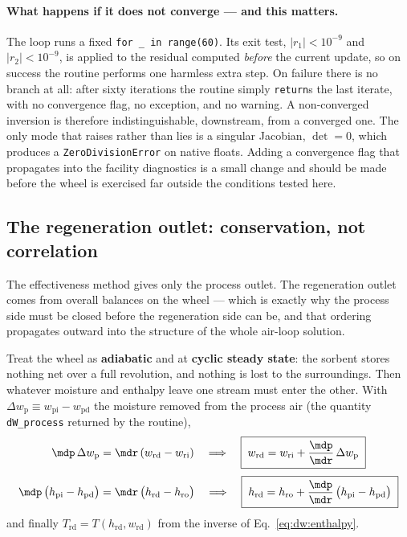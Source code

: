 \paragraph{What happens if it does not converge --- and this matters.}
The loop runs a fixed \texttt{for \_ in range(60)}. Its exit test,
$|r_1|<10^{-9}$ and $|r_2|<10^{-9}$, is applied to the residual computed
\emph{before} the current update, so on success the routine performs one
harmless extra step. On failure there is no branch at all: after sixty
iterations the routine simply \texttt{return}s the last iterate, with no
convergence flag, no exception, and no warning. A non-converged inversion is
therefore indistinguishable, downstream, from a converged one. The only mode
that raises rather than lies is a singular Jacobian, $\det=0$, which produces
a \texttt{ZeroDivisionError} on native floats. Adding a convergence flag that
propagates into the facility diagnostics is a small change and should be made
before the wheel is exercised far outside the conditions tested here.

\subsection{The regeneration outlet: conservation, not correlation}
\label{sec:dw:regen}

The effectiveness method gives only the process outlet. The regeneration
outlet comes from overall balances on the wheel --- which is exactly why the
process side must be closed before the regeneration side can be, and that
ordering propagates outward into the structure of the whole air-loop
solution.

Treat the wheel as \textbf{adiabatic} and at \textbf{cyclic steady state}: the
sorbent stores nothing net over a full revolution, and nothing is lost to the
surroundings. Then whatever moisture and enthalpy leave one stream must enter
the other. With
$\Delta w_{\mathrm{p}} \equiv w_{\mathrm{pi}} - w_{\mathrm{pd}}$ the moisture
removed from the process air (the quantity \texttt{dW\_process} returned by
the routine),
\begin{equation}
\mdp\,\Delta w_{\mathrm{p}} = \mdr\,(w_{\mathrm{rd}}-w_{\mathrm{ri}})
\quad\Longrightarrow\quad
\boxed{\;w_{\mathrm{rd}} = w_{\mathrm{ri}}
+ \frac{\mdp}{\mdr}\,\Delta w_{\mathrm{p}}\;}
\label{eq:dw:wrd}
\end{equation}
\begin{equation}
\mdp\,\big(h_{\mathrm{pi}}-h_{\mathrm{pd}}\big)
= \mdr\,\big(h_{\mathrm{rd}}-h_{\mathrm{ro}}\big)
\quad\Longrightarrow\quad
\boxed{\;h_{\mathrm{rd}} = h_{\mathrm{ro}}
+ \frac{\mdp}{\mdr}\,\big(h_{\mathrm{pi}}-h_{\mathrm{pd}}\big)\;}
\label{eq:dw:hrd}
\end{equation}
and finally $T_{\mathrm{rd}} = T(h_{\mathrm{rd}},w_{\mathrm{rd}})$ from the
inverse of Eq.~\eqref{eq:dw:enthalpy}.

